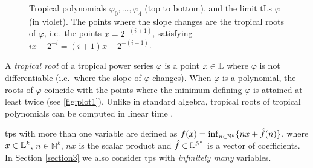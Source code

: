 \begin{wrapfigure}{r}{0.5\textwidth}%
\caption{\small Tropical polynomials $\varphi_0,\dots,\varphi_4$ (top to bottom), and the limit tLs $\varphi$ (in violet). The points where the slope changes are  the tropical roots of $\varphi$, i.e.~the points $x=2^{-(i+1)}$, satisfying $ix+2^{-i}=(i+1)x+2^{-(i+1)}$.}
\label{fig:plot1}%
\end{wrapfigure} %

A \emph{tropical root} of a tropical power series $\varphi$ is a point $x\in \mathbb{L}$ where $\varphi$ is not differentiable (i.e.~where the slope of $\varphi$ changes). When $\varphi$ is a polynomial, the roots of $\varphi$ coincide with the points where the minimum defining $\varphi$ is attained at least twice (see \autoref{fig:plot1}).
Unlike in standard algebra, tropical roots of tropical polynomials can be computed in linear time \cite{Noferini2015}. 


%
tps with more than one variable are defined as $f(x)=\inf_{n\in \mathbb N^{k}}\{nx + \hat{f}(n) \}$, where 
$x\in \mathbb{L}^{k}$, $n\in \mathbb N^{k}$, $nx$ is the scalar product and $\hat{f}\in \mathbb{L}^{{\mathbb N}^{k}}$ is a vector of coefficients. In Section \ref{section3} we also consider tps with \emph{infinitely many} variables.


